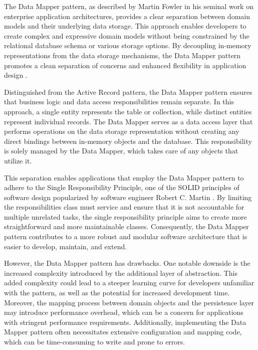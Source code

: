 The Data Mapper pattern, as described by Martin Fowler in his seminal work on
enterprise application architectures, provides a clear separation between domain
models and their underlying data storage. This approach enables developers to
create complex and expressive domain models without being constrained by the
relational database schema or various storage options. By decoupling in-memory
representations from the data storage mechanisms, the Data Mapper pattern
promotes a clean separation of concerns and enhanced flexibility in application
design \cite[p. 165]{fowler-patterns-2003}.

Distinguished from the Active Record pattern, the Data Mapper pattern ensures
that business logic and data access responsibilities remain separate. In this
approach, a single entity represents the table or collection, while distinct
entities represent individual records. The Data Mapper serves as a data access
layer that performs operations on the data storage representation without
creating any direct bindings between in-memory objects and the database. This
responsibility is solely managed by the Data Mapper, which takes care of any
objects that utilize it.

This separation enables applications that employ the Data Mapper pattern to
adhere to the Single Responsibility Principle, one of the SOLID principles of
software design popularized by software engineer Robert C. Martin
\cite{PrinciplesOfOod}. By limiting the responsibilities class must service and
ensure that it is not accountable for multiple unrelated tasks, the single
responsibility principle aims to create more straightforward and more
maintainable classes. Consequently, the Data Mapper pattern contributes to a
more robust and modular software architecture that is easier to develop,
maintain, and extend.

However, the Data Mapper pattern has drawbacks. One notable downside is the
increased complexity introduced by the additional layer of abstraction. This
added complexity could lead to a steeper learning curve for developers
unfamiliar with the pattern, as well as the potential for increased development
time. Moreover, the mapping process between domain objects and the persistence
layer may introduce performance overhead, which can be a concern for
applications with stringent performance requirements. Additionally, implementing
the Data Mapper pattern often necessitates extensive configuration and mapping
code, which can be time-consuming to write and prone to errors.

